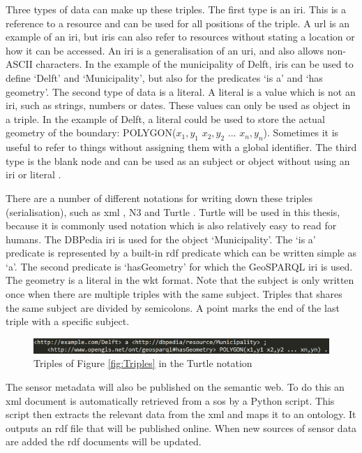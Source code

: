 Three types of data can make up these triples. The first type is an \ac{iri}. This is a reference to a resource and can be used for all positions of the triple. A \ac{url} is an example of an \ac{iri}, but \ac{iri}s can also refer to resources without stating a location or how it can be accessed. An \ac{iri} is a generalisation of an \ac{uri}, and also allows non-ASCII characters. In the example of the municipality of Delft, \ac{iri}s can be used to define `Delft' and `Municipality', but also for the predicates `is a' and `has geometry'. The second type of data is a literal. A literal is a value which is not an \ac{iri}, such as strings, numbers or dates. These values can only be used as object in a triple. In the example of Delft, a literal could be used to store the actual geometry of the boundary: POLYGON($x_{1},y_{1}$ $x_{2},y_{2}$ ... $x_{n},y_{n}$). Sometimes it is useful to refer to things without assigning them with a global identifier. The third type is the blank node and can be used as an subject or object without using an \ac{iri} or literal \citep{LD:W3C6}.  

There are a number of different notations for writing down these triples (serialisation), such as \ac{xml} \citep{LD:W3C3}, N3 \citep{LD:W3C5} and Turtle \citep{LD:W3C4}. Turtle will be used in this thesis, because it is commonly used notation which is also relatively easy to read for humans. The DBPedia \ac{iri} is used for the object `Municipality'. The `is a' predicate is represented by a built-in \ac{rdf} predicate which can be written simple as `a'. The second predicate is `hasGeometry' for which the GeoSPARQL \ac{iri} is used. The geometry is a literal in the \ac{wkt} format. Note that the subject is only written once when there are multiple triples with the same subject. Triples that shares the same subject are divided by semicolons. A point marks the end of the last triple with a specific subject.

\begin{figure}
	\includegraphics[width=1\linewidth]{figs/Turtle.png}
	\caption{Triples of Figure \ref{fig:Triples} in the Turtle notation}
	\label{fig:Turtle}
\end{figure}

The sensor metadata will also be published on the semantic web. To do this an \ac{xml} document is automatically retrieved from a \ac{sos} by a Python script. This script then extracts the relevant data from the \ac{xml} and maps it to an ontology. It outputs an \ac{rdf} file that will be published online. When new sources of sensor data are added the \ac{rdf} documents will be updated.   

